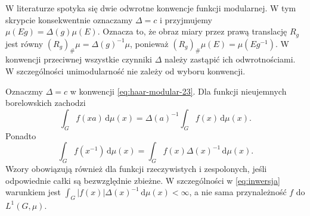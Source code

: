 \begin{uwaga}
W literaturze spotyka się dwie odwrotne konwencje
funkcji modularnej. W tym skrypcie konsekwentnie
oznaczamy $\Delta=c$ i przyjmujemy
$\mu(Eg)=\Delta(g)\mu(E)$. Oznacza to, że obraz
miary przez prawą translację $R_g$ jest równy
$(R_g)_\#\mu=\Delta(g)^{-1}\mu$, ponieważ
$(R_g)_\#\mu(E)=\mu(Eg^{-1})$. W konwencji przeciwnej
wszystkie czynniki $\Delta$ należy zastąpić ich
odwrotnościami. W szczególności unimodularność
nie zależy od wyboru konwencji.
\end{uwaga}

\begin{wniosek}\label{cor:haar-integral-inversion-23}
Oznaczmy $\Delta=c$ w konwencji \eqref{eq:haar-modular-23}. Dla funkcji nieujemnych borelowskich zachodzi
\begin{equation}\label{eq:modularna}
\int_G f(xa)\,\mathrm d\mu(x)=\Delta(a)^{-1}\int_G f(x)\,\mathrm d\mu(x).
\end{equation}
Ponadto
\begin{equation}\label{eq:inwersja}
\int_G f(x^{-1})\,\mathrm d\mu(x)=\int_G f(x)\Delta(x)^{-1}\,\mathrm d\mu(x).
\end{equation}
Wzory obowiązują również dla funkcji rzeczywistych
i zespolonych, jeśli odpowiednie całki są bezwzględnie
zbieżne. W szczególności w \eqref{eq:inwersja}
warunkiem jest $\int_G |f(x)|\Delta(x)^{-1}
\,\mathrm d\mu(x)<\infty$, a nie sama przynależność
$f$ do $L^1(G,\mu)$.
\end{wniosek}
